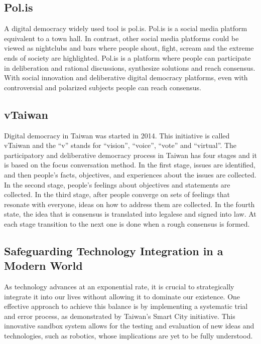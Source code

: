 \documentclass{IEEEtran}
\begin{document}


\subsection{Pol.is}
A digital democracy widely used tool is pol.is. Pol.is is a social media platform equivalent to a town hall. In contrast, other social media platforms could be viewed as nightclubs and bars where people shout, fight, scream and the extreme ends of society are highlighted. Pol.is is a platform where people can participate in deliberation and rational discussions, synthesize solutions and reach consensus.
With social innovation and deliberative digital democracy platforms, even with controversial and polarized subjects people can reach consensus.

\subsection{vTaiwan}
Digital democracy in Taiwan was started in 2014. This initiative is called vTaiwan and the “v” stands for “vision”, “voice”, “vote” and “virtual”. The participatory and deliberative democracy process in Taiwan has four stages and it is based on the focus conversation method. In the first stage, issues are identified, and then people’s facts, objectives, and experiences about the issues are collected. In the second stage, people's feelings about objectives and statements are collected. In the third stage, after people converge on sets of feelings that resonate with everyone, ideas on how to address them are collected. In the fourth state, the idea that is consensus is translated into legalese and signed into law. At each stage transition to the next one is done when a rough consensus is formed.
\subsection{Safeguarding Technology Integration in a Modern World}

As technology advances at an exponential rate, it is crucial to strategically integrate it into our lives without allowing it to dominate our existence. One effective approach to achieve this balance is by implementing a systematic trial and error process, as demonstrated by Taiwan's Smart City initiative. This innovative sandbox system allows for the testing and evaluation of new ideas and technologies, such as robotics, whose implications are yet to be fully understood.
\end{document}
